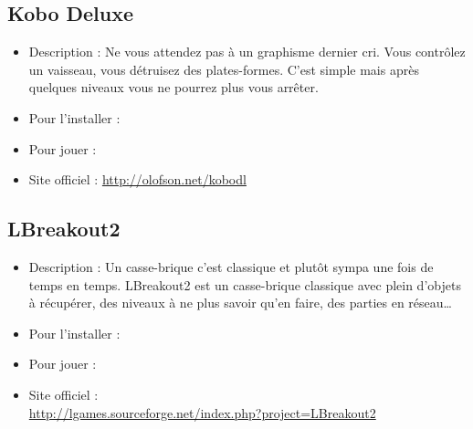 \subsection{Kobo Deluxe}
\begin{itemize}
\begingroup
{}
\item Description : Ne vous attendez pas à un graphisme dernier cri. Vous contrôlez un vaisseau, vous détruisez des plates-formes. C'est simple mais après quelques niveaux vous ne pourrez plus vous arrêter.{\par}
\item Pour l'installer : 
\item Pour jouer : 
\item Site officiel : \url{http://olofson.net/kobodl}{\par}
\endgroup
\end{itemize}
\subsection{LBreakout2}
\begin{itemize}
\begingroup
{}
\item Description : Un casse-brique c'est classique et plutôt sympa une fois de temps en temps. LBreakout2 est un casse-brique classique avec plein d'objets à récupérer, des niveaux à ne plus savoir qu'en faire, des parties en réseau\ldots{}{\par}
\endgroup
\item Pour l'installer : 
\item Pour jouer : 
\item Site officiel :\\\url{http://lgames.sourceforge.net/index.php?project=LBreakout2}{\par}
\end{itemize}
